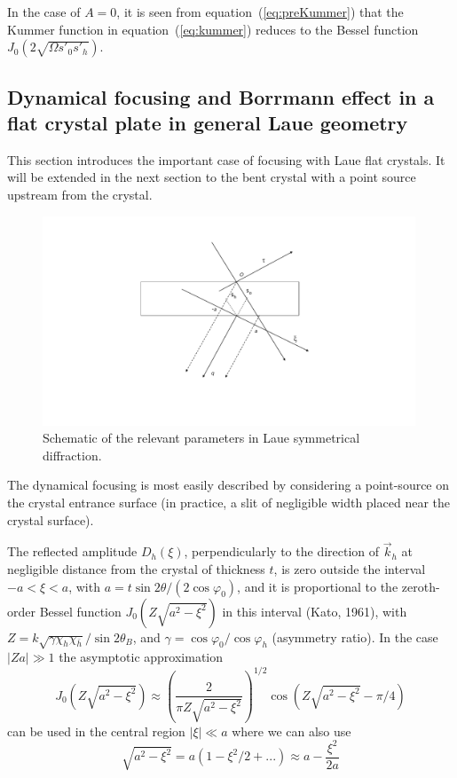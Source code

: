 \documentclass[preprint]{iucr}              %
\newcommand{\inblue}[1]{{\color{blue}#1}}
\begin{document}
In the case of $A=0$, it is seen from equation~(\ref{eq:preKummer}) that the Kummer function in equation~(\ref{eq:kummer}) reduces to the Bessel function $J_0(2\sqrt{\Omega s'_0 s'_h})$. 
          
\subsection{Dynamical focusing and Borrmann effect in a flat crystal plate in general Laue geometry}
\label{sec:LaueFlat}

\inblue{This section introduces the important case of focusing with Laue flat crystals. It will be extended in the next section to the bent crystal with a point source upstream from the crystal.}

\begin{figure}
\label{fig:laue}
\caption{Schematic of the relevant parameters in Laue symmetrical diffraction.
}
\includegraphics[width=0.99\textwidth,trim=7cm 2cm 5cm 1cm,clip=true]{fig_laue.pdf}
\end{figure}

The dynamical focusing is most easily described by considering a point-source on the crystal entrance surface (in practice, a slit of negligible width placed near the crystal surface). 

The reflected amplitude $D_h(\xi)$, perpendicularly to the direction of $\vec k_h$ at negligible distance from the crystal of thickness $t$, is zero outside the interval $-a<\xi<a$, with $a=t \sin2\theta/(2 \cos\varphi_0)$, and it is proportional to the zeroth-order Bessel function  $J_0(Z\sqrt{a^2-\xi^2})$ in this interval (Kato, 1961), with  $Z=k\sqrt{\gamma\chi_h\chi_{\bar h}}/\sin2\theta_B$, and $\gamma=\cos\varphi_0/\cos\varphi_h$ (asymmetry ratio). In the case $|Za| \gg 1$ the asymptotic approximation
\begin{equation}
    J_0(Z\sqrt{a^2-\xi^2})\approx \left(\frac{2}{\pi Z \sqrt{a^2-\xi^2}}\right)^{1/2} \cos(Z\sqrt{a^2-\xi^2}-\pi/4)
\end{equation}
can be used in the central region $|\xi|\ll a$ where we can also use
\begin{equation}
     \sqrt{a^2-\xi^2} = a (1-\xi^2/2+...)\approx a - \frac{\xi^2}{2a}
\end{equation}
\end{document}
